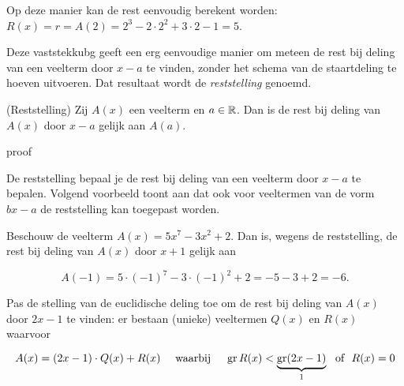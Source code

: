 \documentclass{ximera}
\begin{document}
Op deze manier kan de rest eenvoudig berekent worden: $R(x) = r = A(2) = 2^3 - 2 \cdot 2^2 + 3 \cdot 2 - 1 = 5$.



Deze vaststekkubg geeft een erg eenvoudige manier om meteen de rest bij deling van een veelterm door $x-a$ te vinden, zonder het schema van de staartdeling te hoeven uitvoeren. Dat resultaat wordt de \textit{ reststelling} genoemd.

\begin{theorem} (Reststelling)
Zij $A(x)$ een veelterm en $a \in \mathbb{R}$. Dan is de rest bij deling van $A(x)$ door $x-a$ gelijk aan $A(a)$.
\end{theorem} 


\begin{expandable}{proof}{}




De reststelling bepaal je de rest bij deling van een veelterm door $x-a$ te bepalen. Volgend voorbeeld toont aan dat ook voor veeltermen van de vorm $bx-a$ de reststelling kan toegepast worden. 

\begin{example} 
Beschouw de veelterm $A(x) = 5x^7 - 3x^2 + 2$. Dan is, wegens de reststelling, de rest bij deling van $A(x)$ door $x+1$ gelijk aan

\[
A(-1) = 5 \cdot (-1)^7 - 3 \cdot (-1)^2 + 2 = -5-3+2 = -6.
\]

Pas de stelling van de euclidische deling toe om de rest bij deling van $A(x)$ door $2x-1$ te vinden: er bestaan (unieke) veeltermen $Q(x)$ en $R(x)$ waarvoor

\[
A(x) = (2x-1)\cdot Q(x) + R(x) \quad \text{ waarbij } \quad \operatorname{gr} R(x) < \underbrace{\operatorname{gr} (2x-1)}_{1} \,\, \text{ of } \,\, R(x) = 0
\]


\end{example}
\end{expandable}
\end{document}
